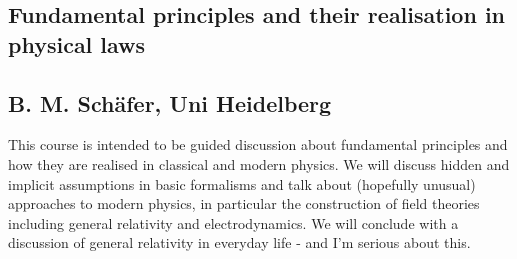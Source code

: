 \subsection*{Fundamental principles and their realisation in physical laws}
\subsection*{B. M. Sch\"afer, Uni Heidelberg}
\noindent This course is intended to be guided discussion about fundamental principles and how they are realised in classical and modern physics. We will discuss hidden and implicit assumptions in basic formalisms and talk about (hopefully unusual) approaches to modern physics, in particular the construction of field theories including general relativity and electrodynamics. We will conclude with a discussion of general relativity in everyday life - and I’m serious about this.
